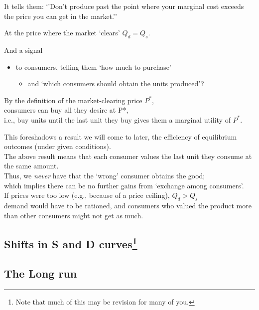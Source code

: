 \documentclass[]{article}
\providecommand{\tightlist}{%
  \setlength{\itemsep}{0pt}\setlength{\parskip}{0pt}}
\begin{document}
It tells them: `'Don't produce past the point where your marginal cost
exceeds the price you can get in the market.''

At the price where the market `clears' \(Q_d=Q_s\).

And a signal

\begin{itemize}
\tightlist
\item
  to consumers, telling them `how much to purchase'

  \begin{itemize}
  \tightlist
  \item
    and `which consumers should obtain the units produced'?
  \end{itemize}
\end{itemize}

\bigskip

By the definition of the market-clearing price \(P^*\),\\
consumers can buy all they desire at P*,\\
i.e., buy units until the last unit they buy gives them a marginal
utility of \(P^*\).

\bigskip

This foreshadows a result we will come to later, the efficiency of
equilibrium outcomes (under given conditions).\\
The above result means that each consumer values the last unit they
consume at the same amount.\\
Thus, we \emph{never} have that the `wrong' consumer obtains the good;\\
which implies there can be no further gains from `exchange among
consumers'.\\

If prices were too low (e.g., because of a price ceiling), \(Q_d>Q_s\)\\
demand would have to be rationed, and consumers who valued the product
more than other consumers might not get as much.

\hypertarget{shifts-in-s-and-d-curves}{%
\subsection[Shifts in S and D curves]{\texorpdfstring{Shifts in S and D
curves\footnote{Note that much of this may be revision for many of you.}}{Shifts in S and D curves}}\label{shifts-in-s-and-d-curves}}

\hypertarget{the-long-run}{%
\subsection{The Long run}\label{the-long-run}}
\end{document}
